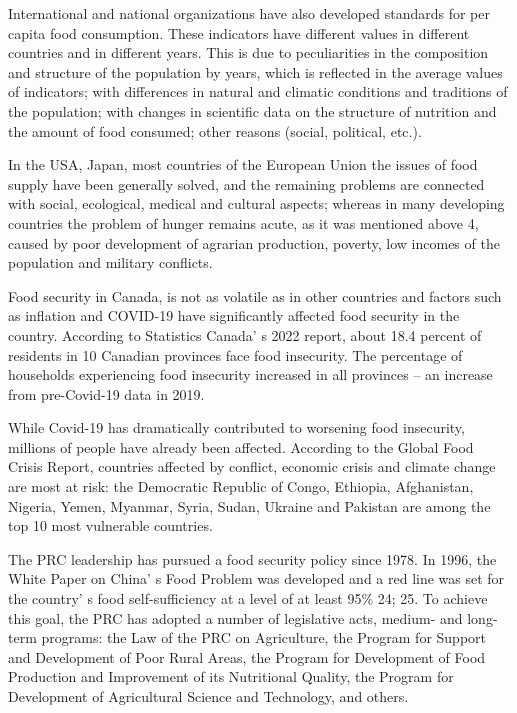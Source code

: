 \begin{multicols}{2}
International and national organizations have also developed standards
for per capita food consumption. These indicators have different values
in different countries and in different years. This is due to
peculiarities in the composition and structure of the population by
years, which is reflected in the average values of indicators; with
differences in natural and climatic conditions and traditions of the
population; with changes in scientific data on the structure of
nutrition and the amount of food consumed; other reasons (social,
political, etc.).

In the USA, Japan, most countries of the European Union the issues of
food supply have been generally solved, and the remaining problems are
connected with social, ecological, medical and cultural aspects; whereas
in many developing countries the problem of hunger remains acute, as it
was mentioned above 4, caused by poor development of agrarian
production, poverty, low incomes of the population and military
conflicts.

Food security in Canada, is not as volatile as in other countries and
factors such as inflation and COVID-19 have significantly affected food
security in the country. According to Statistics
Canada' s 2022 report, about 18.4 percent of residents in
10 Canadian provinces face food insecurity. The percentage of households
experiencing food insecurity increased in all provinces -- an increase
from pre-Covid-19 data in 2019.

While Covid-19 has dramatically contributed to worsening food
insecurity, millions of people have already been affected. According to
the Global Food Crisis Report, countries affected by conflict, economic
crisis and climate change are most at risk: the Democratic Republic of
Congo, Ethiopia, Afghanistan, Nigeria, Yemen, Myanmar, Syria, Sudan,
Ukraine and Pakistan are among the top 10 most vulnerable countries.

The PRC leadership has pursued a food security policy since 1978. In
1996, the White Paper on China' s Food Problem was
developed and a red line was set for the country' s food
self-sufficiency at a level of at least 95\% 24; 25. To achieve this
goal, the PRC has adopted a number of legislative acts, medium- and
long-term programs: the Law of the PRC on Agriculture, the Program for
Support and Development of Poor Rural Areas, the Program for Development
of Food Production and Improvement of its Nutritional Quality, the
Program for Development of Agricultural Science and Technology, and
others.


\end{multicols}
